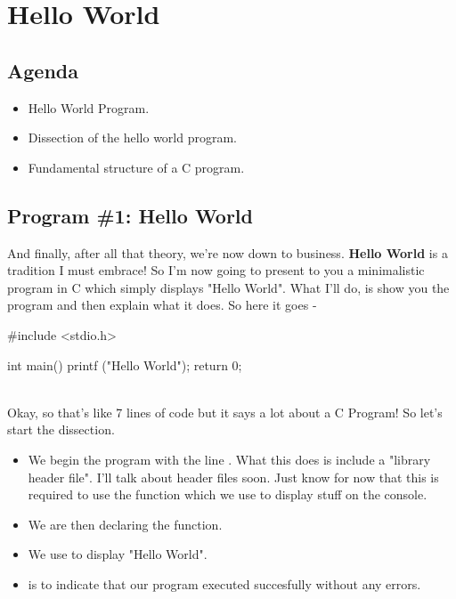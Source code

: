 \chapter{Hello World}


\section{Agenda}
\begin{itemize}
 \item Hello World Program.
 \item Dissection of the hello world program.
 \item Fundamental structure of a C program.
\end{itemize}

\section{Program \#1: Hello World}
And finally, after all that theory, we're now down to business. \textbf{Hello World} is a tradition I must embrace! So I'm now going to present to you a minimalistic program in C which simply displays "Hello World". What I'll do, is show you the program and then explain what it does. So here it goes - \\

\begin{ccode}
#include <stdio.h>

int main()
{
  printf ("Hello World\n");
  return 0;
}
\end{ccode}
\\

Okay, so that's like 7 lines of code but it says a lot about a C Program! So let's start the dissection.

\begin{itemize}
 \item We begin the program with the line . What this does is include a "library header file". I'll talk about header files soon. Just know for now that this is required to use the function  which we use to display stuff on the console. 
 \item We are then declaring the  function. 
 \item We use  to display "Hello World".
 \item {} is to indicate that our program executed succesfully without any errors.
\end{itemize}
